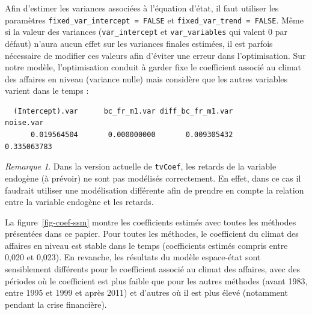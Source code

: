 \documentclass[
  a4paper,
  DIV=11,
  numbers=noendperiod,
  french]{scrartcl}
\newenvironment{Shaded}{\begin{snugshade}}{\end{snugshade}}
\newcommand{\AttributeTok}[1]{\textcolor[rgb]{0.40,0.45,0.13}{#1}}
\newcommand{\ConstantTok}[1]{\textcolor[rgb]{0.56,0.35,0.01}{#1}}
\newcommand{\FunctionTok}[1]{\textcolor[rgb]{0.28,0.35,0.67}{#1}}
\newcommand{\NormalTok}[1]{\textcolor[rgb]{0.00,0.23,0.31}{#1}}
\newcommand{\OtherTok}[1]{\textcolor[rgb]{0.00,0.23,0.31}{#1}}
\newcommand{\SpecialCharTok}[1]{\textcolor[rgb]{0.37,0.37,0.37}{#1}}
\newcommand\1{{\mathds 1}}
\theoremstyle{remark}
\newtheorem*{remark}{Remarque}
\begin{document}
Afin d'estimer les variances associées à l'équation d'état, il faut
utiliser les paramètres \texttt{fixed\_var\_intercept\ =\ FALSE} et
\texttt{fixed\_var\_trend\ =\ FALSE}. Même si la valeur des variances
(\texttt{var\_intercept} et \texttt{var\_variables} qui valent 0 par
défaut) n'aura aucun effet sur les variances finales estimées, il est
parfois nécessaire de modifier ces valeurs afin d'éviter une erreur dans
l'optimisation. Sur notre modèle, l'optimisation conduit à garder fixe
le coefficient associé au climat des affaires en niveau (variance nulle)
mais considère que les autres variables varient dans le temps :

\begin{Shaded}
\end{Shaded}

\begin{verbatim}
  (Intercept).var      bc_fr_m1.var diff_bc_fr_m1.var         noise.var 
      0.019564504       0.000000000       0.009305432       0.335063783 
\end{verbatim}

\begin{remark}
Dans la version actuelle de \texttt{tvCoef}, les retards de la variable
endogène (à prévoir) ne sont pas modélisés correctement. En effet, dans
ce cas il faudrait utiliser une modélisation différente afin de prendre
en compte la relation entre la variable endogène et les retards.
\end{remark}

La figure~\ref{fig-coef-ssm} montre les coefficients estimés avec toutes
les méthodes présentées dans ce papier. Pour toutes les méthodes, le
coefficient du climat des affaires en niveau est stable dans le temps
(coefficients estimés compris entre 0,020 et 0,023). En revanche, les
résultats du modèle espace-état sont sensiblement différents pour le
coefficient associé au climat des affaires, avec des périodes où le
coefficient est plus faible que pour les autres méthodes (avant 1983,
entre 1995 et 1999 et après 2011) et d'autres où il est plus élevé
(notamment pendant la crise financière).
\end{document}
